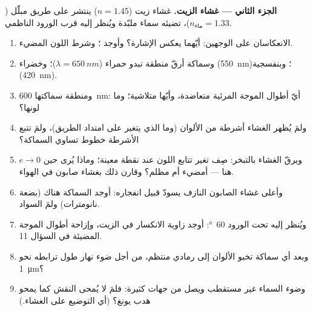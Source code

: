 \begin{problem}
\medskip
\noindent\textbf{الجزء الثاني --- غشاء الزيت.}
غشاء زيت ($n = 1.45$) ينتشر على طريق مبلّل ($n_{\text{ماء}} = 1.33$)،
تضيئه سماء ملبّدة ويُنظر إليه قرب الورود الناظمي.
\begin{enumerate}[resume]
  \item الانعكاسان على الوجهين: أيّهما يعكس الإشارة؟ وأوجد ؛ وشرط اللون المضيء.
  \item وسماكة أرقّ منطقة تبدو حمراء ($\lambda =
        \qty{650}{nm}$)؛ وخضراء (\qty{550}{nm})؛ وبنفسجية (\qty{420}{nm}).
  \item ومنطقة سماكتها \qty{600}{nm}: أيّ أطوال الموجة المرئية
        متعاضدة، وأيّها متلاشية؛ وما لونها؟
  \item ولمَ يُظهر الغشاء أشرطة من الألوان (وما الذي يتغير على امتداد
        الطريق)، ولمَ تتبع الأشرطة خطوط تساوي السماكة؟
  \item ويرقّ الغشاء بالتبخر: صِف تغير تتابع
        اللون عند نقطة معينة؛ وماذا يُرى حين $e \to 0$
        هنا --- أمضيء أم مظلم؟ وقارن ذلك بغشاء صابون في الهواء.
  \item وأعلى غشاء الصابون النازف يسودّ قبيل
        انفجاره: أوجد السماكة هناك (بضعة نانومترات) ولمَ السواد.
  \item ويُنظر إليه تحت الورود \qty{60}{\degree}: أوجد زاوية الانكسار في الزيت،
        وإزاحة أطوال الموجة المضيئة في السؤال 11.
  \item وبعد أي سماكة تخبو الألوان إلى رمادي
        منتظم، من أجل ضوء نهار طول ترابطه نحو \qty{1}{\micro m}؟
  \item وضوء السماء غير مستقطب ويصل من جهات
        كثيرة: فلمَ لا يُمحى النقش كما يمحو 
        هدب يونغ؟ (أي التوضيع على الغشاء.)
\end{enumerate}


\end{problem}
